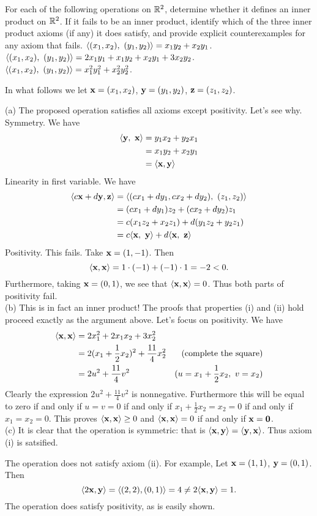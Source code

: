\ii For each of the following operations on ${\mathbb R}^2$, determine whether it defines an inner product on ${\mathbb R}^2$. If it fails to be an inner product, identify which of the three inner product axioms (if any) it does satisfy, and  provide explicit counterexamples for any axiom that fails.
\bb
\ii $\angvec{(x_1,x_2),\ (y_1,y_2)}=x_1y_2+x_2y_1$. 
\ii $\angvec{(x_1,x_2),\ (y_1,y_2)}=2x_1y_1+x_1y_2+x_2y_1+3x_2y_2$. 
\ii $\angvec{(x_1,x_2), \ (y_1,y_2)}=x_1^2y_1^2+x_2^2y_2^2$.
\ee
\begin{solution}
\noindent
In what follows we let ${\mathbf x}=(x_1,x_2)$, ${\mathbf y}=(y_1,y_2)$, ${\mathbf z}=(z_1,z_2)$. 

(a) The proposed operation satisfies all axioms except positivity. Let's see why. 
\\
Symmetry. We have 
\begin{align*}
\langle {\mathbf y},\ {\mathbf x}\rangle&=y_1x_2+y_2x_1\\
&=x_1y_2+x_2y_1\\
&=\langle {\mathbf x}, {\mathbf y}\rangle
\end{align*}
Linearity in first variable. We have 
\begin{align*}
\angvec{c\boldx+d\boldy,\boldz}&=\angvec{(cx_1+dy_1,cx_2+dy_2),\ (z_1,z_2)}\\
&=(cx_1+dy_1)z_2+(cx_2+dy_2)z_1\\
&=c(x_1z_2+x_2z_1)+d(y_1z_2+y_2z_1)\\
&=c\angvec{\boldx,\ \boldy}+d\angvec{\boldx, \ \boldz}
\end{align*}
Positivity. This fails. Take ${\mathbf x}=(1,-1)$. Then 
\[
\langle {\mathbf x},{\mathbf x}\rangle=1\cdot (-1)+(-1)\cdot 1=-2<0.
\]
Furthermore, taking ${\mathbf x}=(0,1)$, we see that $\langle {\mathbf x},{\mathbf x}\rangle=0$. Thus both parts of positivity fail. 
\vspace{.1in}
\\
(b) This is in fact an inner product! The proofs that properties  (i) and (ii) hold proceed exactly as the argument above. Let's focus on positivity. We have 
\begin{align*}
\langle {\mathbf x},{\mathbf x}\rangle&=2x_1^2+2x_1x_2+3x_2^2\\
&=2(x_1+\frac{1}{2}x_2)^2+\frac{11}{4}x_2^2 &\text{(complete the square)}\\
&=2u^2+\frac{11}{4}v^2 &(u=x_1+\frac{1}{2}x_2, \ v=x_2)
\end{align*}
Clearly the expression $2u^2+\frac{11}{4}v^2$ is nonnegative. Furthermore this will be equal to zero if and only if $u=v=0$ if and only if $x_1+\frac{1}{2}{x_2}=x_2=0$ if and only if $x_1=x_2=0$. This proves $\langle {\mathbf x},{\mathbf x}\rangle\geq 0$ and $\langle {\mathbf x}, {\mathbf x}\rangle=0$ if and only if ${\mathbf x}={\mathbf 0}$. 
\vspace{.1in}
\\
(c) It is clear that the operation is symmetric: that is $\langle {\mathbf x}, {\mathbf y}\rangle=\langle {\mathbf y},{\mathbf x}\rangle$. 
Thus axiom (i) is satsified. 

\noindent
The operation does not satisfy axiom (ii). For example, Let ${\mathbf x}=(1,1)$, ${\mathbf y}=(0,1)$. Then 
\[
\langle 2{\mathbf x},{\mathbf y}\rangle=\langle (2,2),(0,1)\rangle=4\ne 2\langle {\mathbf x},{\mathbf y}\rangle=1.
\]
The operation does satisfy positivity, as is easily shown. 
\end{solution}
